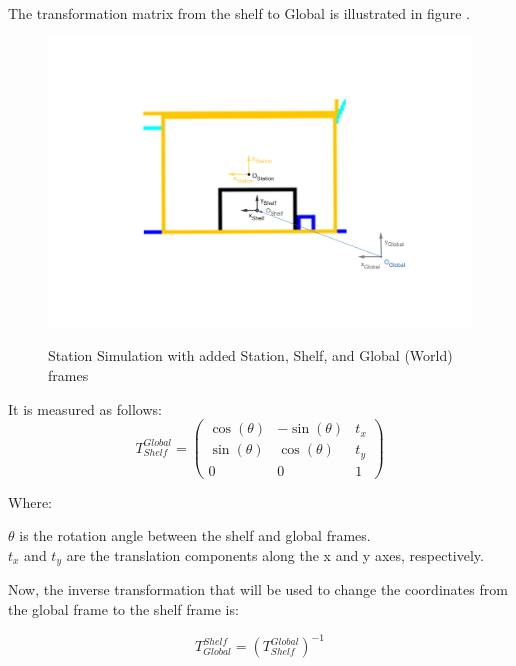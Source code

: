The transformation matrix from the shelf to Global is illustrated in figure .

\begin{figure}[H]
    \begin{center}
        \includegraphics[width=5in]{images/Chap2/Fixed_frames.png}\\
        \caption{Station Simulation with added Station, Shelf, and Global (World) frames}
        \label{Station}
        \end{center}    
\end{figure}

It is measured as follows:
\begin{equation}
    T_{Shelf}^{Global} = 
    \begin{pmatrix}
    \cos(\theta) & -\sin(\theta) & t_x \\
    \sin(\theta) & \cos(\theta) & t_y \\
    0 & 0 & 1
    \label{shToGlob}
    \end{pmatrix}
    \end{equation}
    
    \noindent Where:
    
    \noindent $\theta$ is the rotation angle between the shelf and global frames. \\

    \noindent $t_x$ and $t_y$ are the translation components along the x and y axes, respectively.
    
    \vspace{1em} 
Now, the inverse transformation that will be used to change the coordinates from 
the global frame to the shelf frame is:
    
    \begin{equation}
    T_{Global}^{Shelf} = \left( T_{Shelf}^{Global} \right)^{-1}
    \end{equation}

